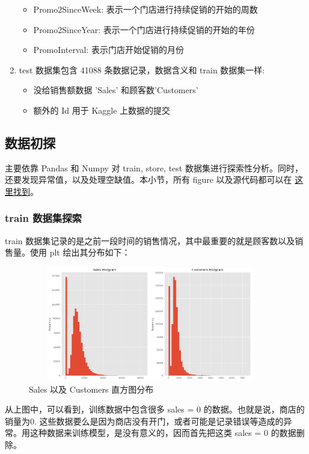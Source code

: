 \documentclass[a4paper]{article}
\begin{document}
\begin{enumerate}
\begin{itemize}
        \item Promo2SinceWeek: 表示一个门店进行持续促销的开始的周数
        \item Promo2SinceYear: 表示一个门店进行持续促销的开始的年份
        \item PromoInterval: 表示门店开始促销的月份
    \end{itemize}
    \item test 数据集包含 41088 条数据记录，数据含义和 train 数据集一样:
    \begin{itemize}
        \item 没给销售额数据 'Sales' 和顾客数'Customers'
        \item 额外的 Id 用于 Kaggle 上数据的提交
    \end{itemize}

\end{enumerate}













\subsection{数据初探} \label{sub:da}
主要依靠 Pandas 和 Numpy 对 train, store, test 数据集进行探索性分析。同时，还要发现异常值，以及处理空缺值。本小节，所有 figure 以及源代码都可以在 \href{https://github.com/lidatou1991/udacity_final_rossmann/blob/master/rossmann_final_EDA.ipynb}{这里找到}。
\subsubsection{train 数据集探索}
train 数据集记录的是之前一段时间的销售情况，其中最重要的就是顾客数以及销售量。使用 plt 绘出其分布如下：

\begin{figure}[ht]
 \centering
 \includegraphics[height=5cm, width=0.95\textwidth]{images/train-hist.png}
 \caption{Sales 以及 Customers 直方图分布}
 \label{fig:train-hist}
\end{figure}
从上图中，可以看到，训练数据中包含很多 sales = 0 的数据。也就是说，商店的销量为0. 这些数据要么是因为商店没有开门，或者可能是记录错误等造成的异常。用这种数据来训练模型，是没有意义的，因而首先把这类 sales = 0 的数据删除。
\end{document}
